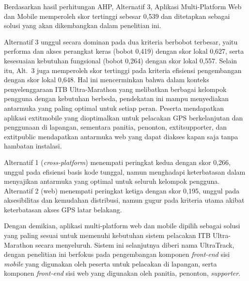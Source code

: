 Berdasarkan hasil perhitungan AHP, Alternatif 3, Aplikasi Multi-Platform Web dan Mobile memperoleh skor tertinggi sebesar 0,539 dan ditetapkan sebagai solusi yang akan dikembangkan dalam penelitian ini.

Alternatif 3 unggul secara dominan pada dua kriteria berbobot terbesar, yaitu performa dan akses perangkat keras (bobot 0,419) dengan skor lokal 0,627, serta kesesuaian kebutuhan fungsional (bobot 0,264) dengan skor lokal 0,557. Selain itu, Alt.~3 juga memperoleh skor tertinggi pada kriteria efisiensi pengembangan dengan skor lokal 0,648. Hal ini mencerminkan bahwa dalam konteks penyelenggaraan ITB Ultra-Marathon yang melibatkan berbagai kelompok pengguna dengan kebutuhan berbeda, pendekatan ini mampu menyediakan antarmuka yang paling optimal untuk setiap peran. Peserta mendapatkan aplikasi 	extit{mobile} yang dioptimalkan untuk pelacakan GPS berkelanjutan dan penggunaan di lapangan, sementara panitia, penonton, 	extit{supporter}, dan 	extit{public} mendapatkan antarmuka web yang dapat diakses kapan saja tanpa hambatan instalasi.

Alternatif 1 (\textit{cross-platform}) menempati peringkat kedua dengan skor 0,266, unggul pada efisiensi basis kode tunggal, namun menghadapi keterbatasan dalam menyajikan antarmuka yang optimal untuk seluruh kelompok pengguna. Alternatif 2 (web) menempati peringkat ketiga dengan skor 0,195, unggul pada aksesibilitas dan kemudahan distribusi, namun gugur pada kriteria utama akibat keterbatasan akses GPS latar belakang.

Dengan demikian, aplikasi multi-platform web dan mobile dipilih sebagai solusi yang paling sesuai untuk memenuhi kebutuhan sistem pelacakan ITB Ultra-Marathon secara menyeluruh. Sistem ini selanjutnya diberi nama UltraTrack, dengan penelitian ini berfokus pada pengembangan komponen \textit{front-end} sisi \textit{mobile} yang digunakan oleh peserta untuk pelacakan di lapangan, serta komponen \textit{front-end} sisi web yang digunakan oleh panitia, penonton, \textit{supporter}.